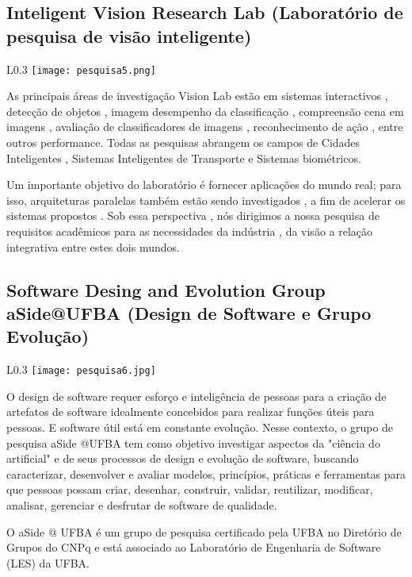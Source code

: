      \subsection{Inteligent Vision Research Lab
     (Laboratório de pesquisa de visão inteligente)}
     \begin{wrapfigure}{L}{0.3\textwidth}
            \centering
            \texttt{[image: pesquisa5.png]}
        \end{wrapfigure} 
      As principais áreas de investigação Vision Lab estão em sistemas interactivos , detecção de objetos , imagem desempenho da classificação , compreensão cena em imagens , avaliação de classificadores de imagens , reconhecimento de ação , entre outros performance. Todas as pesquisas abrangem os campos de Cidades Inteligentes , Sistemas Inteligentes de Transporte e Sistemas biométricos.
	  
	  Um importante objetivo do laboratório é fornecer aplicações do mundo real; para isso, arquiteturas paralelas também estão sendo investigados , a fim de acelerar os sistemas propostos . Sob essa perspectiva , nós dirigimos a nossa pesquisa de requisitos acadêmicos para as necessidades da indústria , da visão a relação integrativa entre estes dois mundos.
     
     \subsection{Software Desing and Evolution Group aSide@UFBA
      (Design de Software e Grupo Evolução)}
      \begin{wrapfigure}{L}{0.3\textwidth}
            \centering
            \texttt{[image: pesquisa6.jpg]}
        \end{wrapfigure} 
      O design de software requer esforço e inteligência de pessoas para a criação de artefatos de software idealmente concebidos para realizar funções úteis para pessoas. E software útil está em constante evolução. Nesse contexto, o grupo de pesquisa aSide @UFBA tem como objetivo investigar aspectos da "ciência do artificial" e de seus processos de design e evolução de software, buscando caracterizar, desenvolver e avaliar modelos, princípios, práticas e ferramentas para que pessoas possam criar, desenhar, construir, validar, reutilizar, modificar, analisar, gerenciar e desfrutar de software de qualidade. 
	  
	  O aSide @ UFBA é um grupo de pesquisa certificado pela UFBA no Diretório de Grupos do CNPq e está associado ao Laboratório de Engenharia de Software (LES) da UFBA.
     

